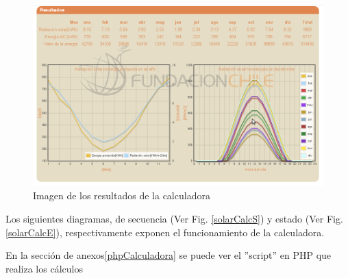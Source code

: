 \begin{figure}[h!]
        \centering
        \includegraphics[scale=0.4]{images/calculadoraFoto2}
        \caption{Imagen de los resultados de la calculadora}
        \label{solarCalcFoto2}
\end{figure}

\newpage
Los siguientes diagramas, de secuencia (Ver Fig. \ref{solarCalcS}) y estado (Ver Fig. \ref{solarCalcE}), respectivamente exponen el funcionamiento de la calculadora.

 En la sección de anexos\ref{phpCalculadora} se puede ver el ''script'' en PHP que realiza los cálculos\\

